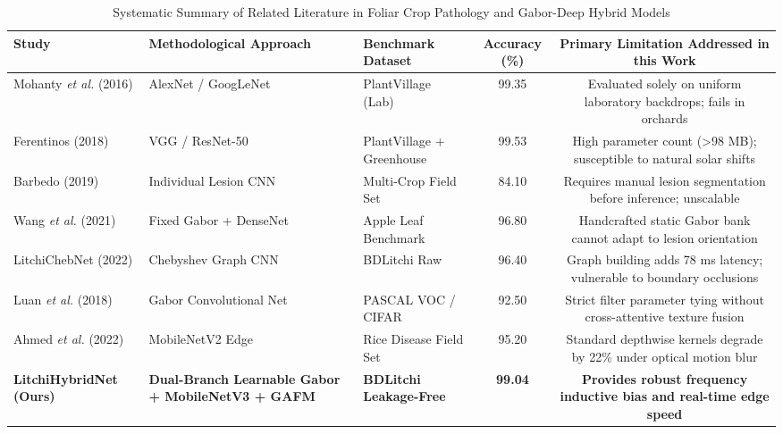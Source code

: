 \begin{table}[t]
\centering
\caption{Systematic Summary of Related Literature in Foliar Crop Pathology and Gabor-Deep Hybrid Models}
\label{tab:related}
\begin{tabular}{p{3.2cm}p{3.8cm}p{3.2cm}cc}
\toprule
\textbf{Study} & \textbf{Methodological Approach} & \textbf{Benchmark Dataset} & \textbf{Accuracy (\%)} & \textbf{Primary Limitation Addressed in this Work} \\
\midrule
Mohanty \textit{et al.} (2016) \cite{mohanty2016using} & AlexNet / GoogLeNet & PlantVillage (Lab) & 99.35 & Evaluated solely on uniform laboratory backdrops; fails in orchards \\
Ferentinos (2018) \cite{ferentinos2018deep} & VGG / ResNet-50 & PlantVillage + Greenhouse & 99.53 & High parameter count (>98 MB); susceptible to natural solar shifts \\
Barbedo (2019) \cite{barbedo2019plant} & Individual Lesion CNN & Multi-Crop Field Set & 84.10 & Requires manual lesion segmentation before inference; unscalable \\
Wang \textit{et al.} (2021) \cite{wang2021gabor} & Fixed Gabor + DenseNet & Apple Leaf Benchmark & 96.80 & Handcrafted static Gabor bank cannot adapt to lesion orientation \\
LitchiChebNet (2022) \cite{litchi_dataset_2022} & Chebyshev Graph CNN & BDLitchi Raw & 96.40 & Graph building adds 78 ms latency; vulnerable to boundary occlusions \\
Luan \textit{et al.} (2018) \cite{luan2018gabor} & Gabor Convolutional Net & PASCAL VOC / CIFAR & 92.50 & Strict filter parameter tying without cross-attentive texture fusion \\
Ahmed \textit{et al.} (2022) \cite{ahmed2022field} & MobileNetV2 Edge & Rice Disease Field Set & 95.20 & Standard depthwise kernels degrade by 22\% under optical motion blur \\
\midrule
\textbf{LitchiHybridNet (Ours)} & \textbf{Dual-Branch Learnable Gabor + MobileNetV3 + GAFM} & \textbf{BDLitchi Leakage-Free} & \textbf{99.04} & \textbf{Provides robust frequency inductive bias and real-time edge speed} \\
\bottomrule
\end{tabular}
\end{table}
